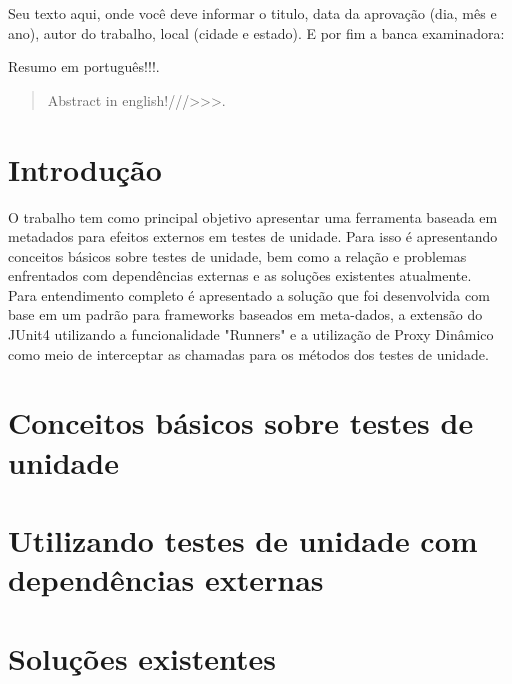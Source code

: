 \documentclass{abnt}
\begin{document}
\capa
\folhaderosto

\setlength{\ABNTsignthickness}{1pt}
\begin{folhadeaprovacao}
	Seu texto aqui, onde você deve informar o titulo, data da aprovação (dia, mês e ano), autor do trabalho, local (cidade e estado). E por fim a banca examinadora:
\end{folhadeaprovacao}

\begin{resumo}
	Resumo em português!!!.
\end{resumo}

\begin{abstract}
	Abstract in english!///>>>.
\end{abstract}

\sumario
\listoffigures

\chapter{Introdução} O trabalho tem como principal objetivo apresentar uma ferramenta baseada em metadados para efeitos externos em testes de unidade. Para isso é apresentando conceitos básicos sobre testes de unidade, bem como a relação e problemas enfrentados com dependências externas e as soluções existentes atualmente.\\
Para entendimento completo é apresentado a solução que foi desenvolvida com base em um padrão para frameworks baseados em meta-dados, a extensão do JUnit4 utilizando a funcionalidade "Runners" e a utilização de Proxy Dinâmico como meio de interceptar as chamadas para os métodos dos testes de unidade.\\

\chapter{Conceitos básicos sobre testes de unidade}



\chapter{Utilizando testes de unidade com dependências externas} 
\chapter{Soluções existentes}
\end{document}

